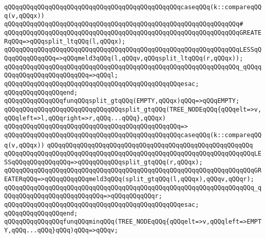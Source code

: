\verb|qQQqqQQqqQQqqQQqqQQqqQQqqQQqqQQqqQQqqQQqqQQqqQQqcaseqQQq(k::compareqQQq(v,qQQqx))|\newline
\verb|qQQqqQQqqQQqqQQqqQQqqQQqqQQqqQQqqQQqqQQqqQQqqQQqqQQqqQQqqQQqqQQq#|\newline
\verb|qQQqqQQqqQQqqQQqqQQqqQQqqQQqqQQqqQQqqQQqqQQqqQQqqQQqqQQqqQQqqQQqGREATERqQQq=>qQQqsplit_ltqQQq(l,qQQqx);|\newline
\verb|qQQqqQQqqQQqqQQqqQQqqQQqqQQqqQQqqQQqqQQqqQQqqQQqqQQqqQQqqQQqqQQqLESSqQQqqQQqqQQqqQQq=>qQQqmeld3qQQq(l,qQQqv,qQQqsplit_ltqQQq(r,qQQqx));|\newline
\verb|qQQqqQQqqQQqqQQqqQQqqQQqqQQqqQQqqQQqqQQqqQQqqQQqqQQqqQQqqQQqqQQq_qQQqqQQqqQQqqQQqqQQqqQQqqQQq=>qQQql;|\newline
\verb|qQQqqQQqqQQqqQQqqQQqqQQqqQQqqQQqqQQqqQQqqQQqqQQqesac;|\newline
\verb|qQQqqQQqqQQqqQQqend;|\newline
\newline
\verb|qQQqqQQqqQQqqQQqfunqQQqsplit_gtqQQq(EMPTY,qQQqx)qQQq=>qQQqEMPTY;|\newline
\newline
\verb|qQQqqQQqqQQqqQQqqQQqqQQqqQQqqQQqsplit_gtqQQq(TREE_NODEqQQq{qQQqelt=>v,qQQqleft=>l,qQQqright=>r,qQQq...qQQq},qQQqx)|\newline
\verb|qQQqqQQqqQQqqQQqqQQqqQQqqQQqqQQqqQQqqQQqqQQqqQQq=>|\newline
\verb|qQQqqQQqqQQqqQQqqQQqqQQqqQQqqQQqqQQqqQQqqQQqqQQqcaseqQQq(k::compareqQQq(v,qQQqx))|\newline
\verb|qQQqqQQqqQQqqQQqqQQqqQQqqQQqqQQqqQQqqQQqqQQqqQQqqQQqqQQq|\newline
\verb|qQQqqQQqqQQqqQQqqQQqqQQqqQQqqQQqqQQqqQQqqQQqqQQqqQQqqQQqqQQqqQQqqQQqLESSqQQqqQQqqQQqqQQq=>qQQqqQQqqQQqsplit_gtqQQq(r,qQQqx);|\newline
\verb|qQQqqQQqqQQqqQQqqQQqqQQqqQQqqQQqqQQqqQQqqQQqqQQqqQQqqQQqqQQqqQQqqQQqGREATERqQQq=>qQQqqQQqqQQqmeld3qQQq(split_gtqQQq(l,qQQqx),qQQqv,qQQqr);|\newline
\verb|qQQqqQQqqQQqqQQqqQQqqQQqqQQqqQQqqQQqqQQqqQQqqQQqqQQqqQQqqQQqqQQqqQQq_qQQqqQQqqQQqqQQqqQQqqQQqqQQq=>qQQqqQQqqQQqr;|\newline
\verb|qQQqqQQqqQQqqQQqqQQqqQQqqQQqqQQqqQQqqQQqqQQqqQQqesac;|\newline
\verb|qQQqqQQqqQQqqQQqend;|\newline
\newline
\verb|qQQqqQQqqQQqqQQqfunqQQqminqQQq(TREE_NODEqQQq{qQQqelt=>v,qQQqleft=>EMPTY,qQQq...qQQq}qQQq)qQQq=>qQQqv;|\newline
